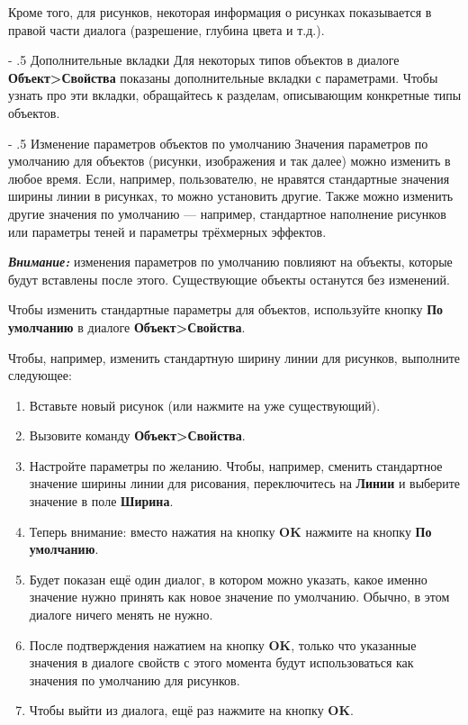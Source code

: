 ﻿\documentclass[a4paper,10pt]{article}
\makeatletter
\renewcommand\paragraph{%
   \@startsection{paragraph}{4}{0mm}%
      {-\baselineskip}%
      {.5\baselineskip}%
      {\normalfont\normalsize\bfseries}}
\makeatother
\begin{document}
Кроме того, для рисунков, некоторая информация о рисунках показывается в правой части диалога (разрешение, глубина цвета и т.д.).

\paragraph{Дополнительные вкладки}
Для некоторых типов объектов в диалоге \textbf{Объект>Свойства} показаны дополнительные вкладки с параметрами. Чтобы узнать про эти вкладки, обращайтесь к разделам, описывающим конкретные типы объектов.

\paragraph{Изменение параметров объектов по умолчанию}
Значения параметров по умолчанию для объектов (рисунки, изображения и так далее) можно изменить в любое время. Если, например, пользователю, не нравятся стандартные значения ширины линии в рисунках, то можно установить другие. Также можно изменить другие значения по умолчанию — например, стандартное наполнение рисунков или параметры теней и параметры трёхмерных эффектов.

\begin{mdframed}[backgroundcolor=blue!10]
\textbf{\textit{Внимание:}} изменения параметров по умолчанию повлияют на объекты, которые будут вставлены после этого. Существующие объекты останутся без изменений.
\end{mdframed}

Чтобы изменить стандартные параметры для объектов, используйте кнопку \textbf{По умолчанию} в диалоге \textbf{Объект>Свойства}.

Чтобы, например, изменить стандартную ширину линии для рисунков, выполните следующее:

\begin{enumerate}
 \item Вставьте новый рисунок (или нажмите на уже существующий).
 \item Вызовите команду \textbf{Объект>Свойства}.
 \item Настройте параметры по желанию. Чтобы, например, сменить стандартное значение ширины линии для рисования, переключитесь на \textbf{Линии} и выберите значение в поле \textbf{Ширина}.
 \item Теперь внимание: вместо нажатия на кнопку \textbf{OK} нажмите на кнопку \textbf{По умолчанию}.
 \item Будет показан ещё один диалог, в котором можно указать, какое именно значение нужно принять как новое значение по умолчанию. Обычно, в этом диалоге ничего менять не нужно.
 \item После подтверждения нажатием на кнопку \textbf{OK}, только что указанные значения в диалоге свойств с этого момента будут использоваться как значения по умолчанию для рисунков.
 \item Чтобы выйти из диалога, ещё раз нажмите на кнопку \textbf{OK}.
\end{enumerate}
\end{document}
